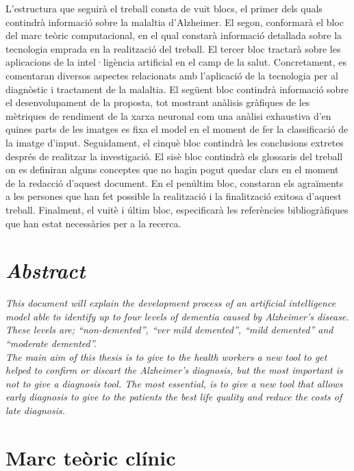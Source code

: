 \documentclass[a4paper,12pt]{report}
\begin{document}
L'estructura que seguirà el treball consta de vuit blocs, el primer dels quals contindrà informació sobre la malaltia d'Alzheimer. El segon, conformarà el bloc del marc teòric computacional, en el qual constarà informació detallada sobre la tecnologia emprada en la realització del treball. El tercer bloc tractarà sobre les aplicacions de la intel·ligència artificial en el camp de la salut. Concretament, es comentaran diversos aspectes relacionats amb l'aplicació de la tecnologia per al diagnòstic i tractament de la malaltia. El següent bloc contindrà informació sobre el desenvolupament de la proposta, tot mostrant anàlisis gràfiques de les mètriques de rendiment de la xarxa neuronal com una anàlisi exhaustiva d'en quines parts de les imatges es fixa el model en el moment de fer la classificació de la imatge d'input. Seguidament, el cinquè bloc contindrà les conclusions extretes després de realitzar la investigació. El sisè bloc contindrà els glossaris del treball on es definiran alguns conceptes que no hagin pogut quedar clars en el moment de la redacció d'aquest document. En el penúltim bloc, constaran els agraïments a les persones que han fet possible la realització i la finalització exitosa d'aquest treball. Finalment, el vuitè i últim bloc, especificarà les referències bibliogràfiques que han estat necessàries per a la recerca.
\chapter*{\textit{Abstract}}
\textit{This document will explain the development process of an artificial intelligence model able to identify up to four levels of dementia caused by Alzheimer's disease. These levels are; “non-demented”, “ver mild demented”, “mild demented” and “moderate demented”.\\
The main aim of this thesis is to give to the health workers a new tool to get helped to confirm or discart the Alzheimer's diagnosis, but the most important is not to give a diagnosis tool. The most essential, is to give a new tool that allows early diagnosis to give to the patients the best life quality and reduce the costs of late diagnosis.}
\chapter*{Marc teòric clínic}
\end{document}
